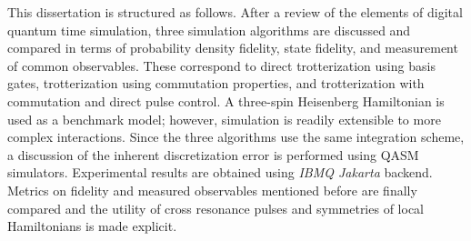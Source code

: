 This dissertation is structured as follows. After a review of the elements of digital quantum time simulation, three simulation algorithms are discussed and compared in terms of probability density fidelity, state fidelity, and measurement of common observables. These correspond to direct trotterization using basis gates, trotterization using commutation properties, and trotterization with commutation and direct pulse control. A three-spin Heisenberg Hamiltonian is used as a benchmark model; however, simulation is readily extensible to more complex interactions. Since the three algorithms use the same integration scheme, a discussion of the inherent discretization error is performed using QASM simulators. Experimental results are obtained using \textit{IBMQ Jakarta} backend. Metrics on fidelity and measured observables mentioned before are finally compared and the utility of cross resonance pulses and symmetries of local Hamiltonians is made explicit.